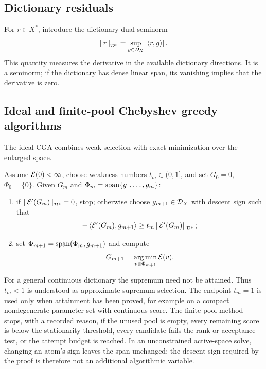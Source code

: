 \subsection{Dictionary residuals}

For \(r\in X^*\), introduce the dictionary dual seminorm
\[
  \left\lVert r\right\rVert_{\mathcal{D}^*}=\sup_{g\in\mathcal{D}_X}\left\lvert \left\langle r,g\right\rangle\right\rvert.
\]
This quantity measures the derivative in the available dictionary directions. It is a seminorm;
if the dictionary has dense linear span, its vanishing implies that the derivative is zero.

\subsection{Ideal and finite-pool Chebyshev greedy algorithms}

The ideal CGA combines weak selection with exact minimization over the enlarged space.

\begin{algorithm}[htbp]
\caption{Continuous weak Chebyshev greedy algorithm}
\label{alg:continuous}
Assume \(\mathcal{E}(0)<\infty\), choose weakness numbers \(t_m\in(0,1]\), and set
\(G_0=0\), \(\Phi_0=\{0\}\). Given
\(G_m\) and \(\Phi_m=\operatorname{span}\{g_1,\ldots,g_m\}\):
\begin{enumerate}[label=\textup{(\roman*)}]
  \item if \(\left\lVert \mathcal{E}'(G_m)\right\rVert_{\mathcal{D}^*}=0\), stop; otherwise choose \(g_{m+1}\in\mathcal{D}_X\) with descent sign such that
  \[
  -\left\langle \mathcal{E}'(G_m),g_{m+1}\right\rangle
  \geq t_m\left\lVert \mathcal{E}'(G_m)\right\rVert_{\mathcal{D}^*};
  \]
  \item set \(\Phi_{m+1}=\operatorname{span}(\Phi_m,g_{m+1})\) and compute
  \[
    G_{m+1}=\operatorname*{arg\,min}_{v\in\Phi_{m+1}}\mathcal{E}(v).
  \]
\end{enumerate}
\end{algorithm}

For a general continuous dictionary the supremum need not be attained. Thus \(t_m<1\) is understood as
approximate-supremum selection. The endpoint \(t_m=1\) is used only when attainment has been proved,
for example on a compact nondegenerate parameter set with continuous score. The finite-pool method
stops, with a recorded reason, if the unused pool is empty, every remaining score is below the
stationarity threshold, every candidate fails the rank or acceptance test, or the attempt budget is
reached. In an unconstrained active-space solve, changing an atom's sign leaves the span unchanged;
the descent sign required by the proof is therefore not an additional algorithmic variable.

